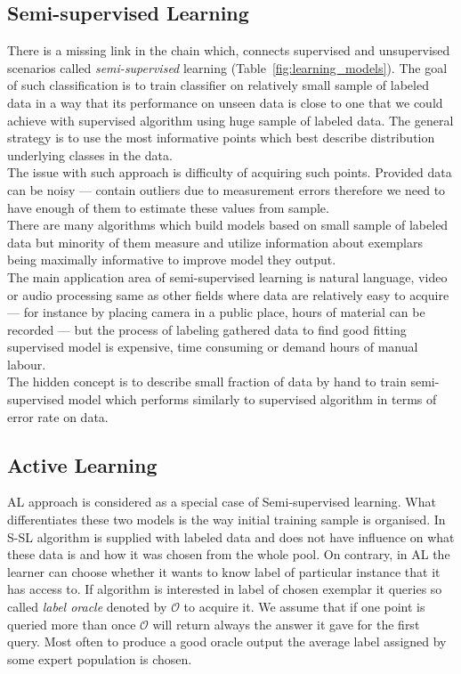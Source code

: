 \documentclass[12pt, a4paper, pdflatex, leqno]{report}
\begin{document}
\subsection{Semi-supervised Learning}
There is a missing link in the chain which, connects supervised and unsupervised scenarios called \emph{semi-supervised} learning (Table~\ref{fig:learning_models}). The goal of such classification is to train classifier on relatively small sample of labeled data in a way that its performance on unseen data is close to one that we could achieve with supervised algorithm using huge sample of labeled data. The general strategy is to use the most informative points which best describe distribution underlying classes in the data.\\
The issue with such approach is difficulty of acquiring such points. Provided data can be noisy --- contain outliers due to measurement errors therefore we need to have enough of them to estimate these values from sample.\\
There are many algorithms which build models based on small sample of labeled data but minority of them measure and utilize information about exemplars being maximally informative to improve model they output.\\

The main application area of semi-supervised learning is natural language, video or audio processing same as other fields where data are relatively easy to acquire --- for instance by placing camera in a public place, hours of material can be recorded --- but the process of labeling gathered data to find good fitting supervised model is expensive, time consuming or demand hours of manual labour.\\
The hidden concept is to describe small fraction of data by hand to train semi-supervised model which performs similarly to supervised algorithm in terms of error rate on data.

\subsection{Active Learning}
AL approach is considered as a special case of Semi-supervised learning. What differentiates these two models is the way initial training sample is organised. In S-SL algorithm is supplied with labeled data and does not have influence on what these data is and how it was chosen from the whole pool. On contrary, in AL the learner can choose whether it wants to know label of particular instance that it has access to. If algorithm is interested in label of chosen exemplar it queries so called \emph{label oracle} denoted by $\mathscr{O}$ to acquire it. We assume that if one point is queried more than once $\mathscr{O}$ will return always the answer it gave for the first query. Most often to produce a good oracle output the average label assigned by some expert population is chosen.\\
\end{document}
